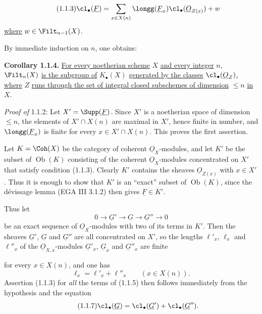 %

\begin{equation}\tag{1.1.3}
\cl_\bullet(\underline{F})=\sum_{x\in X(n)}\longg(\underline{F}_x)\cl_\bullet(\underline{O}_{Z(x)})+w
\end{equation}
\uline{where} $w\in\Filt_{n-1}(X)$.

By immediate induction on $n$, one obtains:

\textbf{Corollary 1.1.4.} \uline{For every noetherian scheme} $X$ \uline{and every integer} $n$, $\Filt_n(X)$ \uline{is the subgroup of} $K_\bullet(X)$ \uline{generated by the classes} $\cl_\bullet(\underline{O}_Z)$\uline{, where} $Z$ \uline{runs through the set of integral closed subschemes of dimension} $\leq n$ \uline{in} $X$.

\emph{Proof of} 1.1.2: Let $X'=\Supp(\underline{F})$. Since $X'$ is a noetherian space of dimension $\leq n$, the elements of $X'\cap X(n)$ are maximal in $X'$, hence finite in number, and $\longg(\underline{F}_x)$ is finite for every $x\in X'\cap X(n)$. This proves the first assertion.

Let ${K}=\Coh(X)$ be the category of coherent $\underline{O}_X$-modules, and let ${K}'$ be the subset of $\operatorname{Ob}({K})$ consisting of the coherent $\underline{O}_X$-modules concentrated on $X'$ that satisfy condition (1.1.3). Clearly ${K}'$ contains the sheaves $\underline{O}_{Z(x)}$ with $x\in X'$. Thus it is enough to show that ${K}'$ is an ``exact'' subset of $\operatorname{Ob}({K})$, since the dévissage lemma (EGA III 3.1.2) then gives $\underline{F}\in{K}'$.

Thus let
\begin{equation}\tag{1.1.5}
0\longrightarrow \underline{G}'\longrightarrow G\longrightarrow \underline{G}''\longrightarrow0
\end{equation}
be an exact sequence of $\underline{O}_X$-modules with two of its terms in ${K}'$. Then the sheaves $\underline{G}'$, $\underline{G}$ and $\underline{G}''$ are all concentrated on $X'$, so the lengths $\ell'_x$, $\ell_x$ and $\ell''_x$ of the $\underline{O}_{X,x}$-modules $\underline{G}'_x$, $\underline{G}_x$ and $\underline{G}''_x$ are finite


%

for every $x\in X(n)$, and one has
\begin{equation}\tag{1.1.6}
\ell_x=\ell'_x+\ell''_x\qquad (x\in X(n)).
\end{equation}
Assertion (1.1.3) for \emph{all} the terms of (1.1.5) then follows immediately from the hypothesis and the equation
\begin{equation}\tag{1.1.7}
\cl_\bullet(\underline{G})=\cl_\bullet(\underline{G}')+\cl_\bullet(\underline{G}'').
\end{equation}

